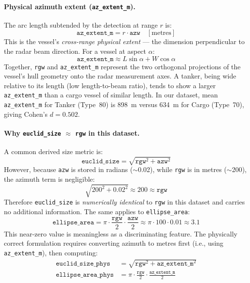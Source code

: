 \documentclass[12pt, a4paper]{article}
\begin{document}
\paragraph{Physical azimuth extent (\texttt{az\_extent\_m}).}
The arc length subtended by the detection at range $r$ is:
\begin{equation}
    \texttt{az\_extent\_m} = r \cdot \texttt{azw} \quad [\text{metres}]
    \label{eq:az_extent}
\end{equation}
This is the vessel's \emph{cross-range physical extent} — the dimension
perpendicular to the radar beam direction. For a vessel at aspect $\alpha$:
\begin{equation}
    \texttt{az\_extent\_m} \approx L \sin\alpha + W \cos\alpha
\end{equation}
Together, \texttt{rgw} and \texttt{az\_extent\_m} represent the two orthogonal
projections of the vessel's hull geometry onto the radar measurement axes.
A tanker, being wide relative to its length (low length-to-beam ratio), tends
to show a larger \texttt{az\_extent\_m} than a cargo vessel of similar length.
In our dataset, mean \texttt{az\_extent\_m} for Tanker (Type~80) is 898~m
versus 634~m for Cargo (Type~70), giving Cohen's $d = 0.502$.

\paragraph{Why \texttt{euclid\_size} $\approx$ \texttt{rgw} in this dataset.}
A common derived size metric is:
\begin{equation}
    \texttt{euclid\_size} = \sqrt{\texttt{rgw}^2 + \texttt{azw}^2}
\end{equation}
However, because \texttt{azw} is stored in radians ($\sim$0.02), while
\texttt{rgw} is in metres ($\sim$200), the azimuth term is negligible:
\begin{equation}
    \sqrt{200^2 + 0.02^2} \approx 200 \approx \texttt{rgw}
\end{equation}
Therefore \texttt{euclid\_size} is \emph{numerically identical} to \texttt{rgw}
in this dataset and carries no additional information. The same applies to
\texttt{ellipse\_area}:
\begin{equation}
    \texttt{ellipse\_area} = \pi \cdot \frac{\texttt{rgw}}{2} \cdot \frac{\texttt{azw}}{2}
    \approx \pi \cdot 100 \cdot 0.01 \approx 3.1
\end{equation}
This near-zero value is meaningless as a discriminating feature.
The physically correct formulation requires converting azimuth to metres first
(i.e., using \texttt{az\_extent\_m}), then computing:
\begin{align}
    \texttt{euclid\_size\_phys} &= \sqrt{\texttt{rgw}^2 + \texttt{az\_extent\_m}^2} \\
    \texttt{ellipse\_area\_phys} &= \pi \cdot \frac{\texttt{rgw}}{2} \cdot \frac{\texttt{az\_extent\_m}}{2}
\end{align}
\end{document}
